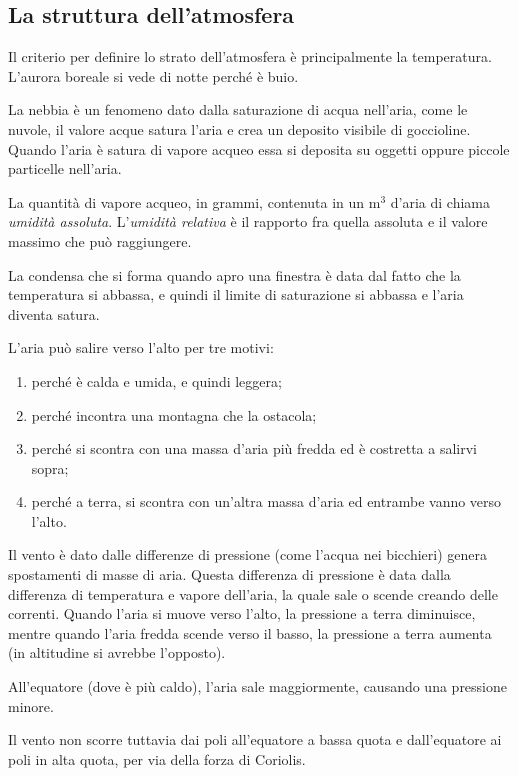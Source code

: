 \documentclass[a4paper]{article}
\begin{document}
\subsection{La struttura dell'atmosfera} %

Il criterio per definire lo strato dell'atmosfera è principalmente la temperatura.
L'aurora boreale si vede di notte perché è buio.

La nebbia è un fenomeno dato dalla saturazione di acqua nell'aria,
come le nuvole, il valore acque satura l'aria e crea un deposito visibile di goccioline.
Quando l'aria è satura di vapore acqueo essa si deposita su oggetti oppure piccole particelle nell'aria.

La quantità di vapore acqueo, in grammi, contenuta in un m\({}^3\) d'aria di chiama \textit{umidità assoluta}.
L'\textit{umidità relativa} è il rapporto fra quella assoluta e il valore massimo che può raggiungere.

La condensa che si forma quando apro una finestra è data dal fatto che la temperatura si abbassa, e quindi
il limite di saturazione si abbassa e l'aria diventa satura.

L'aria può salire verso l'alto per tre motivi:
\begin{enumerate}
    \item perché è calda e umida, e quindi leggera;
    \item perché incontra una montagna che la ostacola;
    \item perché si scontra con una massa d'aria più fredda ed è costretta a salirvi sopra;
    \item perché a terra, si scontra con un'altra massa d'aria ed entrambe vanno verso l'alto.
\end{enumerate}

Il vento è dato dalle differenze di pressione (come l'acqua nei bicchieri)
genera spostamenti di masse di aria.
Questa differenza di pressione è data dalla differenza di temperatura e vapore dell'aria,
la quale sale o scende creando delle correnti.
Quando l'aria si muove verso l'alto, la pressione a terra diminuisce,
mentre quando l'aria fredda scende verso il basso, la pressione a terra aumenta
(in altitudine si avrebbe l'opposto).

All'equatore (dove è più caldo), l'aria sale maggiormente, causando una pressione minore.

Il vento non scorre tuttavia dai poli all'equatore a bassa quota e dall'equatore ai poli in alta quota,
per via della forza di Coriolis.
\end{document}
